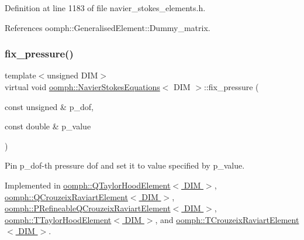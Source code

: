 Definition at line 1183 of file navier\+\_\+stokes\+\_\+elements.\+h.



References oomph\+::\+Generalised\+Element\+::\+Dummy\+\_\+matrix.

\mbox{\label{classoomph_1_1NavierStokesEquations_aa33a3dd5c1cdba0a044e40ad290e487c}} 
\subsubsection{\texorpdfstring{fix\+\_\+pressure()}{fix\_pressure()}}
{\footnotesize\ttfamily template$<$unsigned D\+IM$>$ \\
virtual void \hyperlink{classoomph_1_1NavierStokesEquations}{oomph\+::\+Navier\+Stokes\+Equations}$<$ D\+IM $>$\+::fix\+\_\+pressure (\begin{DoxyParamCaption}\item[{const unsigned \&}]{p\+\_\+dof,  }\item[{const double \&}]{p\+\_\+value }\end{DoxyParamCaption})\hspace{0.3cm}{\ttfamily [pure virtual]}}



Pin p\+\_\+dof-\/th pressure dof and set it to value specified by p\+\_\+value. 



Implemented in \hyperlink{classoomph_1_1QTaylorHoodElement_ab47f75f2720d9f42d1f073d9bf5f5077}{oomph\+::\+Q\+Taylor\+Hood\+Element$<$ D\+I\+M $>$}, \hyperlink{classoomph_1_1QCrouzeixRaviartElement_ae885b689682846f17db8d2e07f711838}{oomph\+::\+Q\+Crouzeix\+Raviart\+Element$<$ D\+I\+M $>$}, \hyperlink{classoomph_1_1PRefineableQCrouzeixRaviartElement_a31a014a5e5d549d793968245d56d5d69}{oomph\+::\+P\+Refineable\+Q\+Crouzeix\+Raviart\+Element$<$ D\+I\+M $>$}, \hyperlink{classoomph_1_1TTaylorHoodElement_af20b4527dcb0206523f22d0dd4825727}{oomph\+::\+T\+Taylor\+Hood\+Element$<$ D\+I\+M $>$}, and \hyperlink{classoomph_1_1TCrouzeixRaviartElement_aacd1c1546b0fffef8c3d8ac27b4b0372}{oomph\+::\+T\+Crouzeix\+Raviart\+Element$<$ D\+I\+M $>$}.

\mbox{\label{classoomph_1_1NavierStokesEquations_aacb9de301ecd9ba0247e05be645955f3}} 
